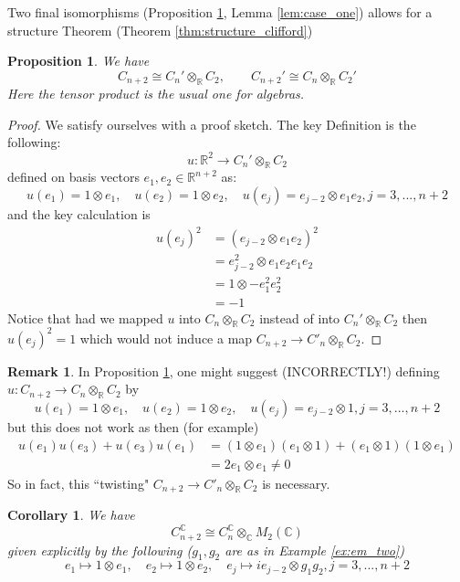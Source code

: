 \documentclass[12pt]{article}
\theoremstyle{plain}
\newtheorem{proposition}[thm]{Proposition}
\newtheorem{cor}[thm]{Corollary}
\theoremstyle{definition}
\newtheorem{remark}[thm]{Remark}
\newcommand{\bb}[1]{\mathbb{#1}}
\newcommand{\lto}{\longrightarrow}
\begin{document}
Two final isomorphisms (Proposition \ref{prop:complex_plus_two}, Lemma \ref{lem:case_one}) allows for a structure Theorem (Theorem \ref{thm:structure_clifford})
\begin{proposition}\label{prop:complex_plus_two}
We have
\begin{equation}
C_{n+2} \cong C_n' \otimes_{\bb{R}}C_2,\qquad C_{n+2}' \cong C_n \otimes_{\bb{R}}C_2'
\end{equation}
Here the tensor product is the usual one for algebras.
\end{proposition}
\begin{proof}
We satisfy ourselves with a proof sketch. The key Definition is the following:
\begin{equation}
u: \bb{R}^2 \lto C_n' \otimes_{\bb{R}}C_2
\end{equation}
defined on basis vectors $e_1,e_2 \in \bb{R}^{n+2}$ as:
\begin{equation}
u(e_1) = 1 \otimes e_1,\quad u(e_2) = 1 \otimes e_2,\quad u(e_j) = e_{j-2} \otimes e_1e_2, j = 3,...,n+2
\end{equation}
and the key calculation is
\begin{align*}
u(e_j)^2 &= (e_{j - 2} \otimes e_1e_2)^2\\
&= e_{j-2}^2 \otimes e_1e_2e_1e_2\\
&= 1 \otimes -e_1^2e_2^2\\
&= -1
\end{align*}
Notice that had we mapped $u$ into $C_n \otimes_{\bb{R}} C_2$ instead of into $C_n' \otimes_{\bb{R}}C_2$ then $u(e_{j})^2 = 1$ which would not induce a map $C_{n+2} \lto C'_n \otimes_{\bb{R}}C_2$.
\end{proof}
\begin{remark}
In Proposition \ref{prop:complex_plus_two}, one might suggest (INCORRECTLY!) defining $u: C_{n+2} \lto C_n \otimes_{\bb{R}}C_2$ by
\begin{equation}
u(e_1) = 1 \otimes e_1,\quad u(e_2) = 1 \otimes e_2,\quad u(e_j) = e_{j-2} \otimes 1, j = 3,...,n+2
\end{equation}
but this does not work as then (for example)
\begin{align*}
u(e_1)u(e_3) + u(e_3)u(e_1) &= (1 \otimes e_1)(e_1 \otimes 1) + (e_1 \otimes 1)(1 \otimes e_1)\\
&= 2e_1 \otimes e_1 \neq 0
\end{align*}
So in fact, this ``twisting" $C_{n+2} \lto C'_n \otimes_{\bb{R}}C_2$ is necessary.
\end{remark}
\begin{cor}
We have
\begin{equation}
C_{n+2}^{\bb{C}} \cong C_n^{\bb{C}} \otimes_{\bb{C}}M_2(\bb{C})
\end{equation}
given explicitly by the following ($g_1,g_2$ are as in Example \ref{ex:em_two})
\begin{equation}
e_1 \longmapsto 1 \otimes e_1,\quad e_2 \longmapsto 1 \otimes e_2,\quad e_j \longmapsto ie_{j-2} \otimes g_1g_2, j = 3,...,n+2
\end{equation}
\end{cor}
\end{document}
